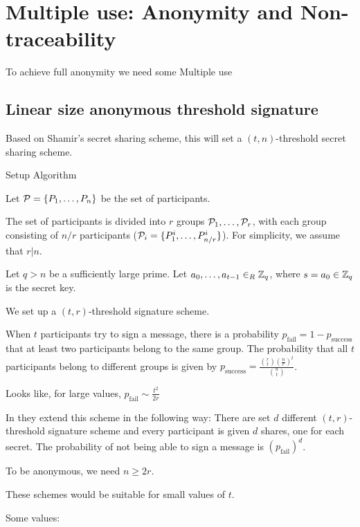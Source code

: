 \chapter{Multiple use: Anonymity and Non-traceability}
To achieve full anonymity we need some 
Multiple use 


\section{Linear size anonymous threshold signature}
\cite{DazaDSV09}

Based on Shamir's secret sharing scheme, this will set a $(t,n)$-threshold secret sharing scheme.

Setup Algorithm

Let ${\mathcal P} = \{P_1 , \dots , P_n \}$ be the set of participants.

The set of participants is divided into $r$ groups ${\mathcal P}_1, \dots , {\mathcal P}_r$, with each group consisting of $n/r$ participants (${\mathcal P}_i = \{P^i_1, \dots , P^i_{n/r}\}$). For simplicity, we assume that $r \vert n$.

Let $q > n$ be a sufficiently large prime. Let $a_0, \dots , a_{t-1} \in_R {\mathbb Z}_q$, where $s=a_0 \in {\mathbb Z}_q$ is the secret key.

We set up a $(t,r)$-threshold signature scheme.

When $t$ participants try to sign a message, there is a probability $p_{\text{fail}} = 1 - p_{\text{success}}$ that at least two participants belong to the same group. The probability that all $t$ participants belong to different groups is given by $p_{\text{success}} = \frac{\binom{r}{t} \left( \frac{n}{r} \right)^{t}}{\binom{n}{t}}$.

Looks like, for large values, $p_{\text{fail}} \sim \frac{t^2}{2r}$

In \cite{DazaDSV09} they extend this scheme in the following way: There are set $d$ different $(t,r)$-threshold signature scheme and every participant is given $d$ shares, one for each secret. The probability of not being able to sign a message is $\left(p_{\text{fail}} \right)^d$.

To be anonymous, we need $n \geq 2r$.

These schemes would be suitable for small values of $t$.

Some values:


